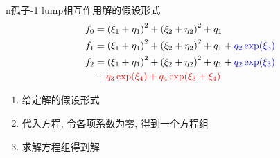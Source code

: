 \documentclass[handout]{beamer}
\newcommand{\sbrace}[1]{\left(#1\right)}
\newcommand{\red}[1]{{\color{red}#1}}
\newcommand{\blue}[1]{{\color{blue}#1}}
\begin{document}
\begin{frame}{n孤子-1 lump相互作用解的假设形式}
\begin{equation}
\begin{aligned}
    f_0 &= \sbrace{\xi_1+\eta_1}^2+\sbrace{\xi_2+\eta_2}^2+q_1\\ 
    f_1 &= \sbrace{\xi_1+\eta_1}^2+\sbrace{\xi_2+\eta_2}^2+q_1+\blue{q_2 \exp(\xi_3)} \\ 
    f_2 &= \sbrace{\xi_1+\eta_1}^2+\sbrace{\xi_2+\eta_2}^2+q_1+\blue{q_2 \exp(\xi_3)} \\
        & +\red{q_3 \exp(\xi_4) + q_4 \exp(\xi_3+\xi_4)}
\end{aligned}
\end{equation}

\begin{enumerate}
\item 给定解的假设形式
\item 代入方程, 令各项系数为零, 得到一个方程组 
\item 求解方程组得到解
\end{enumerate}
\end{frame}
\end{document}
